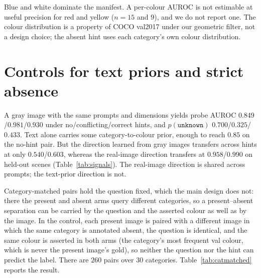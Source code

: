 \documentclass[10pt]{article}
\newcommand{\unknown}{\texttt{unknown}}
\newcommand{\punk}{p(\unknown)}
\begin{document}
Blue and white dominate the manifest. A per-colour AUROC is not estimable at useful precision for red and yellow ($n=15$ and $9$), and we do not report one. The colour distribution is a property of COCO val2017 under our geometric filter, not a design choice; the absent hint uses each category's own colour distribution.

\section{Controls for text priors and strict absence}
\label{app:controls}

A gray image with the same prompts and dimensions yields probe AUROC $0.849$/$0.981$/$0.930$ under no/conflicting/correct hints, and $\punk$ $0.700$/$0.325$/$0.433$. Text alone carries some category-to-colour prior, enough to reach $0.85$ on the no-hint pair. But the direction learned from gray images transfers across hints at only $0.540$/$0.603$, whereas the real-image direction transfers at $0.958$/$0.990$ on held-out scenes (Table~\ref{tab:signals}). The real-image direction is shared across prompts; the text-prior direction is not.

Category-matched pairs hold the question fixed, which the main design does not: there the present and absent arms query different categories, so a present--absent separation can be carried by the question and the asserted colour as well as by the image. In the control, each present image is paired with a different image in which the same category is annotated absent, the question is identical, and the same colour is asserted in both arms (the category's most frequent val colour, which is never the present image's gold), so neither the question nor the hint can predict the label. There are $260$ pairs over $30$ categories. Table~\ref{tab:catmatched} reports the result.
\end{document}
